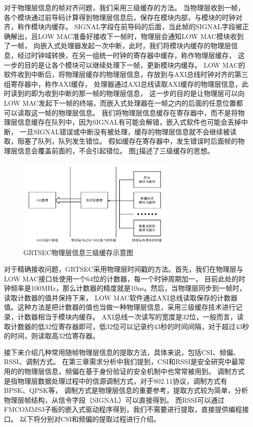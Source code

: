 		对于物理层信息的帧对齐问题，我们采用三级缓存的方法。
		当物理层收到一帧，各个模块通过前导码计算得到物理层信息后，保存在模块内部，与模块的时钟对齐，称作模块内缓存。
		SIGNAL字段在前导码的后面，当此帧的SIGNAL字段被正确解出，且LOW MAC准备好接收下一帧时，物理层会通知LOW MAC模块收到了一帧，
		向嵌入式处理器发起一次中断，此时，我们将模块内缓存的物理层信息，经过时钟域转换，在另一组统一时钟的寄存器中缓存，称作物理层缓存，
		这一步的目的是让各个模块可以继续处理下一帧，更新模块内缓存。
		LOW MAC的软件收到中断后，将物理层缓存的物理层信息，存放到与AXI总线时钟对齐的第三组寄存器中，称作AXI缓存，
		处理器通过AXI总线读取AXI缓存的物理层信息，此时读到的即为收到中断的那一帧的物理层信息，
		这一步的目的是让物理层可以向LOW MAC发起下一帧的终端，而嵌入式处理器在一帧之内的后面的任意位置都可以读取这一帧的物理层信息。
		我们将物理层信息缓存在寄存器中，而不是将物理层信息缓存在队列中，因为SIGNAL有可能会解错，嵌入式软件也可能会丢掉中断，
		一旦SIGNAL错误或中断没有被处理，缓存的物理层信息就不会继续被读取，阻塞了队列，队列发生错位。
		假如缓存在寄存器中，发生错误时后面帧的物理层信息会覆盖前面的，不会引起错位。
		图\ref{fig:phy_info_cache}描述了三级缓存的思想。
			\begin{figure}
				\centering
				\includegraphics[width=0.7\textwidth]{img/phy_info_cache.png}
				\caption{GRTSEC物理层信息三级缓存示意图}
				\label{fig:phy_info_cache}
			\end{figure}

		对于精确接收问题，GRTSEC采用物理层时间戳的方法。首先，我们在物理层与LOW MAC接口处使用一个64位的计数器，每一个时钟周期加一，
		目前此处的时钟频率是100MHz，那么计数器的精度就是10ns。然后，当物理层同步到一帧时，读取计数器的值并保持下来，
		LOW MAC软件通过AXI总线读取保存的计数器值。这种方法是把计数器的值也当做一种物理层信息，采用三级缓存技术进行记录，计数器相当于模块内缓存。
		AXI总线一次读写的宽度是32位，一般而言，读取计数器的低32位寄存器即可，低32位可以记录约43秒的时间间隔，对于超过43秒的时间，则读取高32位寄存器。

		接下来介绍几种常用随帧物理层信息的提取方法，具体来说，包括CSI、频偏、RSSI、调制方式。
		在第三章需求分析中我们提到，CSI和RSSI是安全研究中最常用的的物理层信息，频偏在基于身份验证的安全机制中也常常被用到。
		调制方式是指物理层数据处理过程中的信源调制方式，对于802.11协议，调制方式有BPSK、QPSK等，
		调制方式是物理层信息的重要参考，提取方式较为简单，分析物理层帧结构，从信令字段（SIGNAL）可以直接得到。
		而RSSI可以通过FMCOMMS3子板的嵌入式驱动程序得到，我们不需要进行提取，直接提供编程接口。
		以下将分别对CSI和频偏的提取过程进行介绍。

